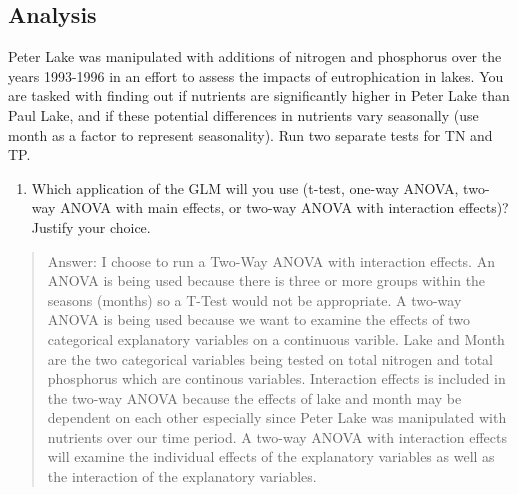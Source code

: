 \documentclass[]{article}
\newenvironment{Shaded}{\begin{snugshade}}{\end{snugshade}}
\newcommand{\CommentTok}[1]{\textcolor[rgb]{0.56,0.35,0.01}{\textit{#1}}}
\newcommand{\DecValTok}[1]{\textcolor[rgb]{0.00,0.00,0.81}{#1}}
\newcommand{\KeywordTok}[1]{\textcolor[rgb]{0.13,0.29,0.53}{\textbf{#1}}}
\newcommand{\NormalTok}[1]{#1}
\newcommand{\OperatorTok}[1]{\textcolor[rgb]{0.81,0.36,0.00}{\textbf{#1}}}
\newcommand{\StringTok}[1]{\textcolor[rgb]{0.31,0.60,0.02}{#1}}
\providecommand{\tightlist}{%
  \setlength{\itemsep}{0pt}\setlength{\parskip}{0pt}}
\begin{document}
\begin{Shaded}
\end{Shaded}

\hypertarget{analysis}{%
\subsection{Analysis}\label{analysis}}

Peter Lake was manipulated with additions of nitrogen and phosphorus
over the years 1993-1996 in an effort to assess the impacts of
eutrophication in lakes. You are tasked with finding out if nutrients
are significantly higher in Peter Lake than Paul Lake, and if these
potential differences in nutrients vary seasonally (use month as a
factor to represent seasonality). Run two separate tests for TN and TP.

\begin{enumerate}
\def\labelenumi{\arabic{enumi}.}
\setcounter{enumi}{3}
\tightlist
\item
  Which application of the GLM will you use (t-test, one-way ANOVA,
  two-way ANOVA with main effects, or two-way ANOVA with interaction
  effects)? Justify your choice.
\end{enumerate}

\begin{quote}
Answer: I choose to run a Two-Way ANOVA with interaction effects. An
ANOVA is being used because there is three or more groups within the
seasons (months) so a T-Test would not be appropriate. A two-way ANOVA
is being used because we want to examine the effects of two categorical
explanatory variables on a continuous varible. Lake and Month are the
two categorical variables being tested on total nitrogen and total
phosphorus which are continous variables. Interaction effects is
included in the two-way ANOVA because the effects of lake and month may
be dependent on each other especially since Peter Lake was manipulated
with nutrients over our time period. A two-way ANOVA with interaction
effects will examine the individual effects of the explanatory variables
as well as the interaction of the explanatory variables.
\end{quote}
\end{document}
